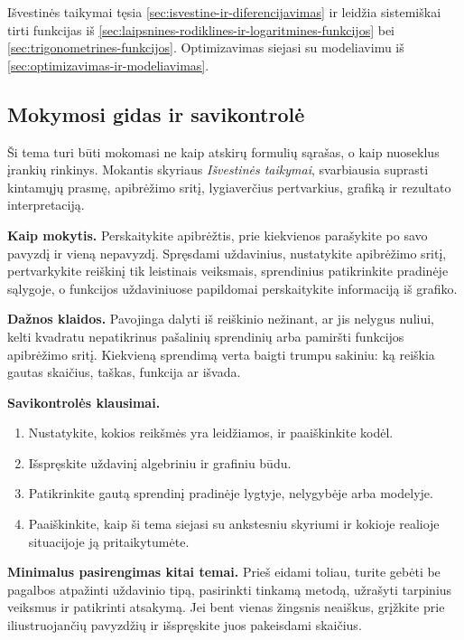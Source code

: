 Išvestinės taikymai tęsia \ref{sec:isvestine-ir-diferencijavimas} ir leidžia sistemiškai tirti funkcijas iš \ref{sec:laipsnines-rodiklines-ir-logaritmines-funkcijos} bei \ref{sec:trigonometrines-funkcijos}. Optimizavimas siejasi su modeliavimu iš \ref{sec:optimizavimas-ir-modeliavimas}.

\subsection{Mokymosi gidas ir savikontrolė}

Ši tema turi būti mokomasi ne kaip atskirų formulių sąrašas, o kaip nuoseklus įrankių rinkinys. Mokantis skyriaus \textit{Išvestinės taikymai}, svarbiausia suprasti kintamųjų prasmę, apibrėžimo sritį, lygiaverčius pertvarkius, grafiką ir rezultato interpretaciją.

\textbf{Kaip mokytis.} Perskaitykite apibrėžtis, prie kiekvienos parašykite po savo pavyzdį ir vieną nepavyzdį. Spręsdami uždavinius, nustatykite apibrėžimo sritį, pertvarkykite reiškinį tik leistinais veiksmais, sprendinius patikrinkite pradinėje sąlygoje, o funkcijos uždaviniuose papildomai perskaitykite informaciją iš grafiko.

\textbf{Dažnos klaidos.} Pavojinga dalyti iš reiškinio nežinant, ar jis nelygus nuliui, kelti kvadratu nepatikrinus pašalinių sprendinių arba pamiršti funkcijos apibrėžimo sritį. Kiekvieną sprendimą verta baigti trumpu sakiniu: ką reiškia gautas skaičius, taškas, funkcija ar išvada.

\textbf{Savikontrolės klausimai.}
\begin{enumerate}[label=\arabic*.]
\item Nustatykite, kokios reikšmės yra leidžiamos, ir paaiškinkite kodėl.
\item Išspręskite uždavinį algebriniu ir grafiniu būdu.
\item Patikrinkite gautą sprendinį pradinėje lygtyje, nelygybėje arba modelyje.
\item Paaiškinkite, kaip ši tema siejasi su ankstesniu skyriumi ir kokioje realioje situacijoje ją pritaikytumėte.
\end{enumerate}

\textbf{Minimalus pasirengimas kitai temai.} Prieš eidami toliau, turite gebėti be pagalbos atpažinti uždavinio tipą, pasirinkti tinkamą metodą, užrašyti tarpinius veiksmus ir patikrinti atsakymą. Jei bent vienas žingsnis neaiškus, grįžkite prie iliustruojančių pavyzdžių ir išspręskite juos pakeisdami skaičius.

